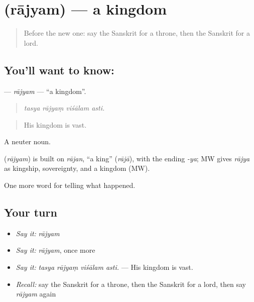\section[\texorpdfstring{\sk{राज्यम्} (rājyam)}{राज्यम् (rājyam)}]{ (rājyam) — a kingdom}

\label{lesson:SA-C316-rajyam}



\begin{quote}
Before the new one: say the Sanskrit for a throne, then the Sanskrit for a lord.
\end{quote}

\subsection*{You'll want to know: }
\textbf{} — \emph{rājyam} — \textquotedblleft{}a kingdom\textquotedblright{}.

\begin{quote}
   
\end{quote}

\begin{quote}
\emph{tasya rājyaṃ viśālam asti.}
\end{quote}

\begin{quote}
His kingdom is vast.
\end{quote}

A neuter noun.

\begin{cousinweb}
\textbf{} (\emph{rājyam}) is built on \emph{rājan}, \textquotedblleft{}a king\textquotedblright{} (\emph{rājā}), with the ending \emph{-ya}; MW gives \emph{rājya} as kingship, sovereignty, and a kingdom (MW).
\end{cousinweb}

\begin{grammarlens}[title={What you've built}]
One more word for telling what happened.
\end{grammarlens}

\subsection*{Your turn}
\begin{itemize}
\raggedright
  \item \emph{Say it:} \emph{rājyam}
  \item \emph{Say it:} \emph{rājyam}, once more
  \item \emph{Say it:} \emph{tasya rājyaṃ viśālam asti.} — His kingdom is vast.
  \item \emph{Recall:} say the Sanskrit for a throne, then the Sanskrit for a lord, then say \emph{rājyam} again
\end{itemize}


